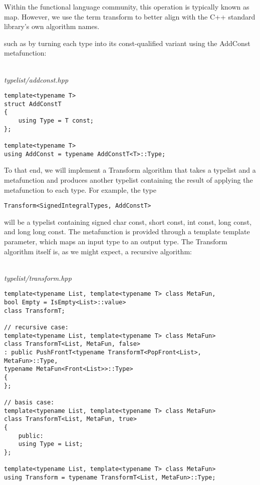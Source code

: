 \begin{tcolorbox}[colback=webgreen!5!white,colframe=webgreen!75!black]
\hspace*{0.75cm}Within the functional language community, this operation is typically known as map. However, we use the term transform to better align with the C++ standard library’s own algorithm names.
\end{tcolorbox}

such as by turning each type into its const-qualified variant using the AddConst metafunction:

\hspace*{\fill} \\ %
\noindent
\textit{typelist/addconst.hpp}
\begin{lstlisting}[style=styleCXX]
template<typename T>
struct AddConstT
{
	using Type = T const;
};

template<typename T>
using AddConst = typename AddConstT<T>::Type;
\end{lstlisting}

To that end, we will implement a Transform algorithm that takes a typelist and a metafunction and produces another typelist containing the result of applying   the metafunction to each type. For example, the type

\begin{lstlisting}[style=styleCXX]
Transform<SignedIntegralTypes, AddConstT>
\end{lstlisting}

will be a typelist containing signed char const, short const, int const, long const, and long long const. The metafunction is provided through a template template parameter, which maps an input type to an output type. The Transform algorithm itself is, as we might expect, a recursive algorithm:

\hspace*{\fill} \\ %
\noindent
\textit{typelist/transform.hpp}
\begin{lstlisting}[style=styleCXX]
template<typename List, template<typename T> class MetaFun,
bool Empty = IsEmpty<List>::value>
class TransformT;

// recursive case:
template<typename List, template<typename T> class MetaFun>
class TransformT<List, MetaFun, false>
: public PushFrontT<typename TransformT<PopFront<List>, MetaFun>::Type,
typename MetaFun<Front<List>>::Type>
{
};

// basis case:
template<typename List, template<typename T> class MetaFun>
class TransformT<List, MetaFun, true>
{
	public:
	using Type = List;
};

template<typename List, template<typename T> class MetaFun>
using Transform = typename TransformT<List, MetaFun>::Type;
\end{lstlisting}


